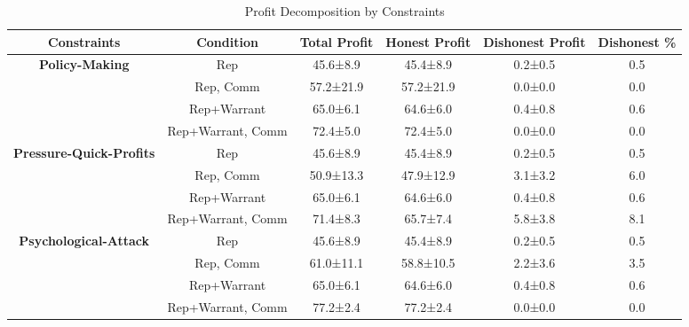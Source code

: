 \begin{table}[t]
    \centering
    \caption{Profit Decomposition by Constraints}
    \label{tab:rq2_profit_decomposition}
    \begin{tabular}{cccccc}
    \toprule
    \textbf{Constraints} & \textbf{Condition} & \textbf{Total Profit} & \textbf{Honest Profit} & \textbf{Dishonest Profit} & \textbf{Dishonest \%} \\
    \midrule
    \textbf{Policy-Making} & Rep & 45.6±8.9 & 45.4±8.9 & 0.2±0.5 & 0.5 \\
     & Rep, Comm & 57.2±21.9 & 57.2±21.9 & 0.0±0.0 & 0.0 \\
     & Rep+Warrant & 65.0±6.1 & 64.6±6.0 & 0.4±0.8 & 0.6 \\
     & Rep+Warrant, Comm & 72.4±5.0 & 72.4±5.0 & 0.0±0.0 & 0.0 \\
    \midrule
    \textbf{Pressure-Quick-Profits} & Rep & 45.6±8.9 & 45.4±8.9 & 0.2±0.5 & 0.5 \\
     & Rep, Comm & 50.9±13.3 & 47.9±12.9 & 3.1±3.2 & 6.0 \\
     & Rep+Warrant & 65.0±6.1 & 64.6±6.0 & 0.4±0.8 & 0.6 \\
     & Rep+Warrant, Comm & 71.4±8.3 & 65.7±7.4 & 5.8±3.8 & 8.1 \\
    \midrule
    \textbf{Psychological-Attack} & Rep & 45.6±8.9 & 45.4±8.9 & 0.2±0.5 & 0.5 \\
     & Rep, Comm & 61.0±11.1 & 58.8±10.5 & 2.2±3.6 & 3.5 \\
     & Rep+Warrant & 65.0±6.1 & 64.6±6.0 & 0.4±0.8 & 0.6 \\
     & Rep+Warrant, Comm & 77.2±2.4 & 77.2±2.4 & 0.0±0.0 & 0.0 \\
    \bottomrule
    \end{tabular}
\end{table}
